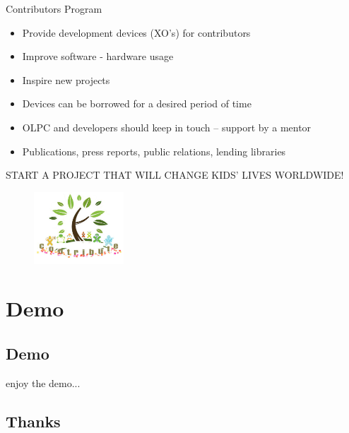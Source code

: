 \documentclass[compress]{beamer}
\begin{document}
\begin{frame}{Contributors Program}
\begin{itemize}
\item Provide development devices (XO's) for contributors
\item Improve software - hardware usage
\item Inspire new projects
\end{itemize}
\pause
\begin{itemize}
\item Devices can be borrowed for a desired period of time
\item OLPC and developers should keep in touch -- support by a mentor
\item Publications, press reports, public relations, lending libraries
\end{itemize}
\pause
\begin{center}
{\color{blue} \tiny START A PROJECT THAT WILL CHANGE KIDS' LIVES WORLDWIDE!}
\end{center}
\begin{figure}
    \centering
    \includegraphics[width=0.3\textwidth]{images/Contributetree1.jpg}
\end{figure}
\end{frame}

\section{Demo}

\subsection{Demo}
\begin{frame}
\huge
enjoy the demo...
\end{frame}

\subsection{Thanks}
\end{document}
